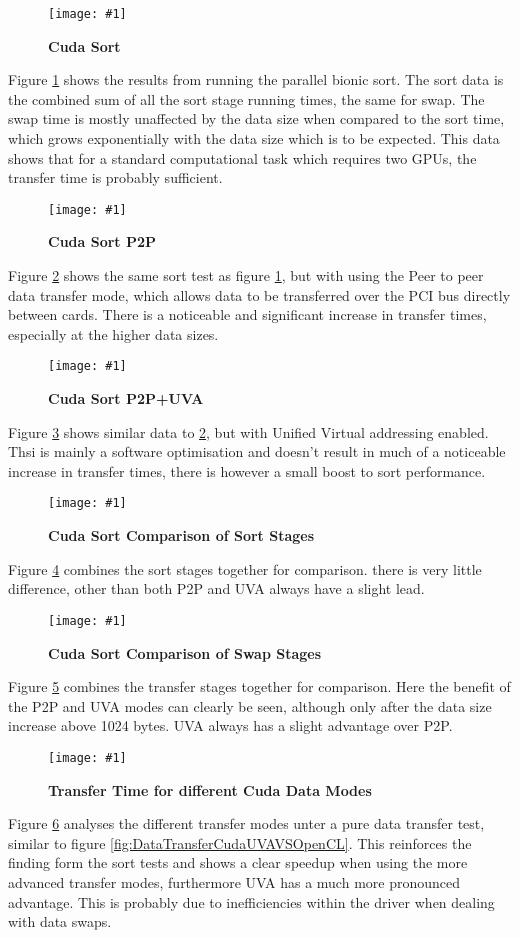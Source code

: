 \documentclass[12pt,a4paper]{article}
\newcommand{\figuremacroWHHN}[3]{
	\begin{figure}[H] %
		\centering
		\texttt{[image: \#1]}
		\caption[#2]{\textbf{#2}}
		\label{fig:#1}
	\end{figure}
}
\begin{document}
\figuremacroWHHN
{TeslaCudaSortStandard}
{Cuda Sort}
{1.0}

Figure \ref{fig:TeslaCudaSortStandard} shows the results from running the parallel bionic sort. The sort data is the combined sum of all the sort stage running times, the same for swap. 
The swap time is mostly unaffected by the data size when compared to the sort time, which grows exponentially with the data size which is to be expected. 
This data shows that for a standard computational task which requires two GPUs, the transfer time is probably sufficient. 

\figuremacroWHHN
{TeslaCudaSortP2P}
{Cuda Sort P2P}
{1.0}
\clearpage
Figure \ref{fig:TeslaCudaSortP2P} shows the same sort test as figure \ref{fig:TeslaCudaSortStandard}, but with using the Peer to peer data transfer mode, which allows data to be transferred over the PCI bus directly between cards.
There is a noticeable and significant increase in transfer times, especially at the higher data sizes.

\figuremacroWHHN
{TeslaCudaSortP2PUVA}
{Cuda Sort P2P+UVA}
{1.0}

Figure \ref{fig:TeslaCudaSortP2PUVA} shows similar data to  \ref{fig:TeslaCudaSortP2P}, but with Unified Virtual addressing enabled. Thsi is mainly a software optimisation and doesn't result in much of a noticeable increase in transfer times, there is however a small boost to sort performance.
\clearpage

\figuremacroWHHN
{TeslaCudaSortSortStages}
{Cuda Sort Comparison of Sort Stages}
{1.0}

Figure \ref{fig:TeslaCudaSortSortStages} combines the sort stages together for comparison. there is very little difference, other than both P2P and UVA always have a slight lead.

\figuremacroWHHN
{TeslaCudaSortSwapStages}
{Cuda Sort Comparison of Swap Stages}
{1.0}

Figure \ref{fig:TeslaCudaSortSwapStages} combines the transfer stages together for comparison. Here the benefit of the P2P and UVA modes can clearly be seen, although only after the data size increase above 1024 bytes.
UVA always has a slight advantage over P2P.

\figuremacroWHHN
{CUDADataTransfer}
{Transfer Time for different Cuda Data Modes}
{1.0}

Figure \ref{fig:CUDADataTransfer} analyses the different transfer modes unter a pure data transfer test, similar to figure \ref{fig:DataTransferCudaUVAVSOpenCL}. This reinforces the finding form the sort tests and shows a clear speedup when using the more advanced transfer modes, furthermore UVA has a much more pronounced advantage. This is probably due to inefficiencies within the driver when dealing with data swaps.
\end{document}
